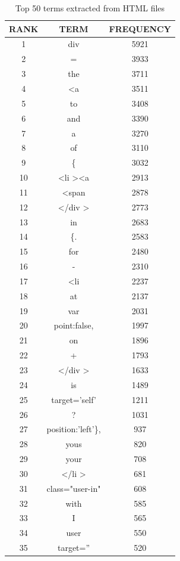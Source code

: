 \begin{table}
\caption{ Top 50 terms extracted from HTML files}
\begin{center}
\begin{tabular}{ c | c | c }
 \hline
 RANK & TERM & FREQUENCY \\ \hline
1 &div &5921\\ \hline
2 &= &3933\\ \hline
3 &the &3711\\ \hline
4 &<a &3511\\ \hline
5 &to &3408\\ \hline
6 &and &3390\\ \hline
7 &a &3270\\ \hline
8 &of &3110\\ \hline
9 & \{&3032\\ \hline
10 &\textless li \textgreater \textless a &2913\\ \hline
11 &\textless span &2878\\ \hline
12 &\textless /div \textgreater &2773\\ \hline
13 &in &2683\\ \hline
14 &\{. &2583\\ \hline
15 &for &2480\\ \hline
16 &- &2310\\ \hline
17 & \textless li &2237\\ \hline
18 &at &2137\\ \hline
19 &var &2031\\ \hline
20 &point:false, &1997\\ \hline
21 &on &1896\\ \hline
22 &+ &1793\\ \hline
23 &\textless /div \textgreater &1633\\ \hline
24 &is &1489\\ \hline
25 & target='self' & 1211\\ \hline
26 &? &1031\\ \hline
27 &position:'left'\}, &937\\ \hline
28 &yous &820\\ \hline
29 &your &708\\ \hline
30 & \textless /li \textgreater&681\\ \hline
31 &class="user-in" &608\\ \hline
32 &with &585\\ \hline
33 &I &565\\ \hline
34 &user &550\\ \hline
35 &target='' &520\\ \hline

\end{tabular}
\end{center}
\end{table}
